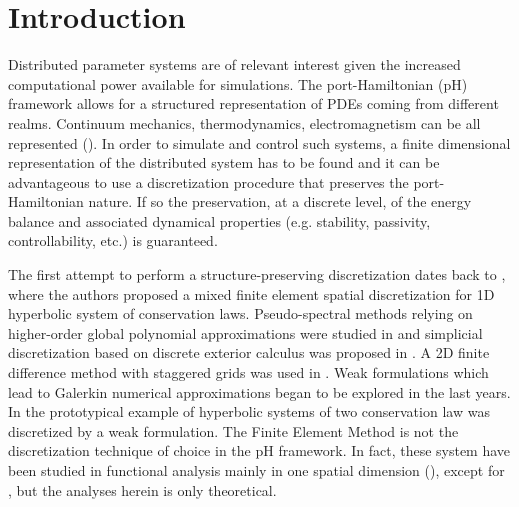 \documentclass{ifacconf}
\begin{document}
\section{Introduction}
Distributed parameter systems are of relevant interest given the increased computational power available for simulations. The port-Hamiltonian (pH) framework allows for a structured representation of PDEs coming from different realms. Continuum mechanics, thermodynamics, electromagnetism can be all represented (\cite{bookPHs, BookZwart}). In order to simulate and control such systems, a finite dimensional representation of the distributed system has to be found and it can be advantageous to use a discretization procedure that preserves the port-Hamiltonian nature. If so the preservation, at a discrete level, of the energy balance and associated dynamical properties (e.g. stability, passivity, controllability, etc.) is guaranteed. 

The first attempt to perform a structure-preserving discretization dates back to \cite{Golo}, where the authors proposed a mixed finite element spatial discretization for 1D hyperbolic system of conservation laws. Pseudo-spectral methods relying on higher-order global polynomial approximations were studied in \cite{moulla:hal-01625008} and simplicial discretization based on discrete exterior calculus was proposed in \cite{SESLIJA20121509}.  A 2D finite difference method with staggered grids was used in \cite{Trenchant}. Weak formulations which lead to Galerkin numerical approximations began to be explored in the last years. In \cite{WeakForm_Kot} the prototypical example of hyperbolic systems of two conservation law was discretized by a weak formulation. The Finite Element Method is not the discretization technique of choice in the pH framework. In fact, these system have been studied in functional analysis mainly in one spatial dimension (\cite{Villegas, augner2016stabilization}), except for \cite{waveEqZwart}, but the analyses herein is only theoretical. 
\end{document}
